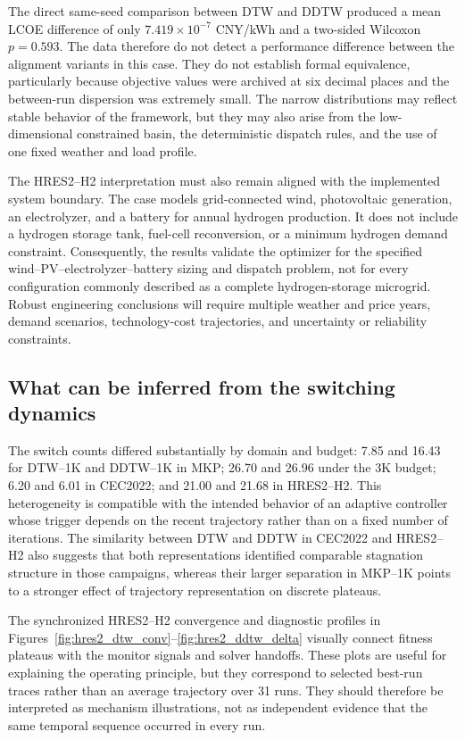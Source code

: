 The direct same-seed comparison between DTW and DDTW produced a mean LCOE
difference of only $7.419\times10^{-7}$ CNY/kWh and a two-sided Wilcoxon
$p=0.593$. The data therefore do not detect a performance difference between
the alignment variants in this case. They do not establish formal equivalence,
particularly because objective values were archived at six decimal places and
the between-run dispersion was extremely small. The narrow distributions may
reflect stable behavior of the framework, but they may also arise from the
low-dimensional constrained basin, the deterministic dispatch rules, and the
use of one fixed weather and load profile.

The HRES2--H2 interpretation must also remain aligned with the implemented
system boundary. The case models grid-connected wind, photovoltaic generation,
an electrolyzer, and a battery for annual hydrogen production. It does not
include a hydrogen storage tank, fuel-cell reconversion, or a minimum hydrogen
demand constraint. Consequently, the results validate the optimizer for the
specified wind--PV--electrolyzer--battery sizing and dispatch problem, not for
every configuration commonly described as a complete hydrogen-storage
microgrid. Robust engineering conclusions will require multiple weather and
price years, demand scenarios, technology-cost trajectories, and uncertainty
or reliability constraints.

\subsection{What can be inferred from the switching dynamics}
\label{sec:discussion-switching}

The switch counts differed substantially by domain and budget: 7.85 and 16.43
for DTW--1K and DDTW--1K in MKP; 26.70 and 26.96 under the 3K budget; 6.20 and
6.01 in CEC2022; and 21.00 and 21.68 in HRES2--H2. This heterogeneity is
compatible with the intended behavior of an adaptive controller whose trigger
depends on the recent trajectory rather than on a fixed number of iterations.
The similarity between DTW and DDTW in CEC2022 and HRES2--H2 also suggests that
both representations identified comparable stagnation structure in those
campaigns, whereas their larger separation in MKP--1K points to a stronger
effect of trajectory representation on discrete plateaus.

The synchronized HRES2--H2 convergence and diagnostic profiles in
Figures~\ref{fig:hres2_dtw_conv}--\ref{fig:hres2_ddtw_delta} visually connect
fitness plateaus with the monitor signals and solver handoffs. These plots are
useful for explaining the operating principle, but they correspond to selected
best-run traces rather than an average trajectory over 31 runs. They should
therefore be interpreted as mechanism illustrations, not as independent
evidence that the same temporal sequence occurred in every run.

